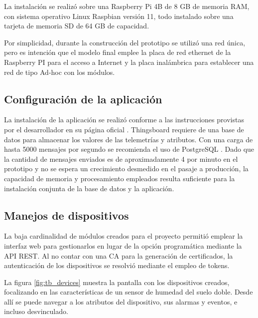 La instalación se realizó sobre una Raspberry Pi 4B de 8 GB de memoria RAM, con sistema operativo Linux Raspbian versión 11, todo instalado sobre una tarjeta de memoria SD de 64 GB de capacidad.

Por simplicidad, durante la construcción del prototipo se utilizó  una red única, pero es intención que el modelo final emplee la placa de red ethernet de la Raspberry PI para el acceso a Internet y la placa inalámbrica para establecer una red de tipo Ad-hoc con los módulos.


\subsection{Configuración de la aplicación}
\label{sec:Configuración de la aplicación}

La instalación de la aplicación se realizó conforme a las instrucciones provistas por el desarrollador en su página oficial \citep{tb_install}.
Thingsboard requiere de una base de datos para almacenar los valores de las telemetrías y atributos. Con una carga de hasta 5000 mensajes por segundo se recomienda el uso de PostgreSQL \citep{postgresql}. Dado que la cantidad de mensajes enviados es de aproximadamente 4 por minuto en el prototipo y no se espera un crecimiento desmedido en el pasaje a producción, la capacidad de memoria y procesamiento empleados resulta suficiente para la instalación conjunta de la base de datos y la aplicación.

\subsection{Manejos de dispositivos}
\label{sec:Manejos de dispositivos}

La baja cardinalidad de módulos creados para el proyecto permitió emplear la interfaz web para gestionarlos en lugar de la opción programática mediante la API REST.
Al no contar con una CA para la generación de certificados, la autenticación de los dispositivos se resolvió mediante el empleo de tokens.

La figura \ref{fig:tb_devices} muestra la pantalla con los dispositivos creados, focalizando en las características de un sensor de humedad del suelo doble. Desde allí se puede navegar a los atributos del dispositivo, sus alarmas y eventos, e incluso desvinculado.



